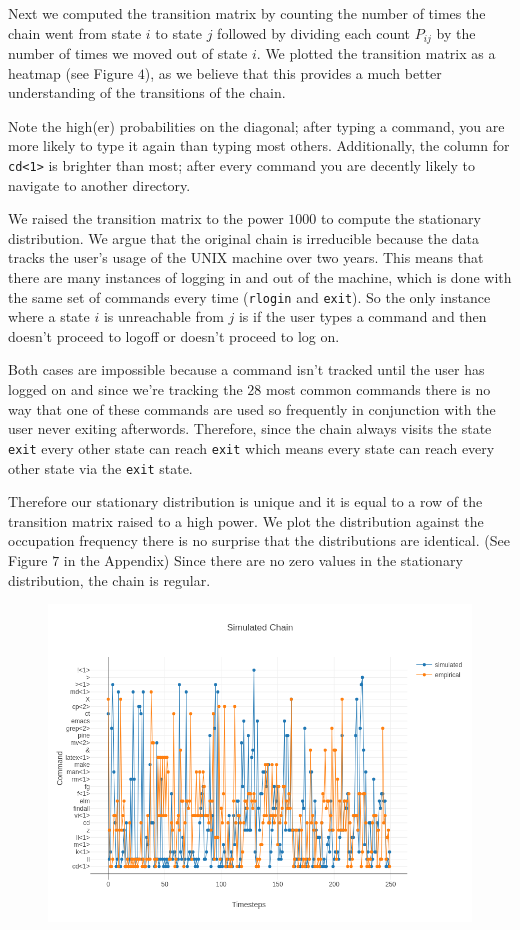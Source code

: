 \documentclass[10pt]{article}
\begin{document}
Next we computed the transition matrix by counting the number of times the chain
went from state $i$ to state $j$ followed by dividing each count $P_{ij}$ by the
number of times we moved out of state $i$. We plotted the transition matrix as a
heatmap (see Figure $4$), as we believe that this provides a much better
understanding of the transitions of the chain. 

Note the high(er) probabilities on the diagonal; after typing a command, you are
more likely to type it again than typing most others. Additionally, the column
for \texttt{cd<1>} is brighter than most; after every command you are decently
likely to navigate to another directory. 

We raised the transition matrix to the power $1000$ to compute the stationary
distribution. We argue that the original chain is irreducible because the data
tracks the user's usage of the UNIX machine over two years. This means that
there are many instances of logging in and out of the machine, which is done
with the same set of commands every time (\texttt{rlogin} and \texttt{exit}). So
the only instance where a state $i$ is unreachable from $j$ is if the user types
a command and then doesn't proceed to logoff or doesn't proceed to log on.

Both cases are impossible because a command isn't tracked until the user has
logged on and since we're tracking the $28$ most common commands there is no way
that one of these commands are used so frequently in conjunction with the user
never exiting afterwords.  Therefore, since the chain always visits the state
\texttt{exit} every other state can reach \texttt{exit} which means every  state
can reach every other state via the \texttt{exit} state.

Therefore our stationary distribution is unique and it is equal to a row of the
transition matrix raised to a high power. We plot the distribution against the
occupation frequency there is no surprise that the distributions are identical.
(See Figure $7$ in the Appendix) Since there are no zero values in the
stationary distribution, the chain is regular.

\begin{figure}[!htb]
  \centering
  \includegraphics[scale=.45]{../pictures/simul-chain-vs-empirical-chain.png}
  \caption{}
\end{figure}
\end{document}
